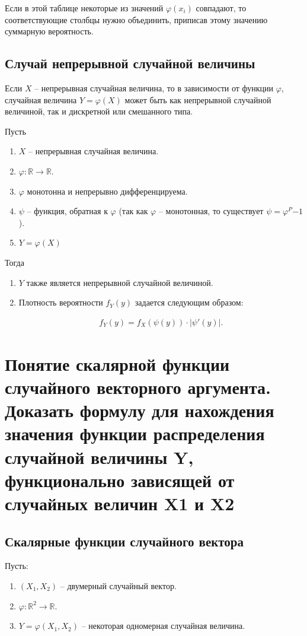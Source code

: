 Если в этой таблице некоторые из значений $\varphi(x_i)$ совпадают, то соответствующие столбцы нужно объединить, приписав этому значению суммарную вероятность.

\subsection*{Случай непрерывной случайной величины}

Если $X$ -- непрерывная случайная величина, то в зависимости от функции $\varphi$, случайная величина $Y = \varphi(X)$ может быть как непрерывной случайной величиной, так и дискретной или смешанного типа.

Пусть
\begin{enumerate}
	\item $X$ -- непрерывная случайная величина.
	\item $\varphi: \mathbb{R} \to \mathbb{R}$.
	\item $\varphi$ монотонна и непрерывно дифференцируема.
	\item $\psi$ -- функция, обратная к $\varphi$ (так как $\varphi$ -- монотонная, то существует $\psi = \varphi^P{-1}$).
	\item $Y = \varphi(X)$
\end{enumerate}

Тогда
\begin{enumerate}
	\item $Y$ также является непрерывной случайной величиной.
	\item Плотность вероятности $f_Y(y)$ задается следующим образом: 
	
	\begin{align*}
		f_Y(y) = f_X(\psi(y)) \cdot\left|\psi'(y)\right|.
	\end{align*}
\end{enumerate}

\section{Понятие скалярной функции случайного векторного аргумента. Доказать формулу для нахождения значения функции распределения случайной величины Y, функционально зависящей от случайных величин X1 и X2}

\subsection*{Скалярные функции случайного вектора}

Пусть:
\begin{enumerate}
	
	\item $(X_1,X_2)$ -- двумерный случайный вектор.
	\item $\varphi: \mathbb{R}^2 \to \mathbb{R}$.
	\item $Y = \varphi(X_1, X_2)$ -- некоторая одномерная случайная величина.
\end{enumerate}


